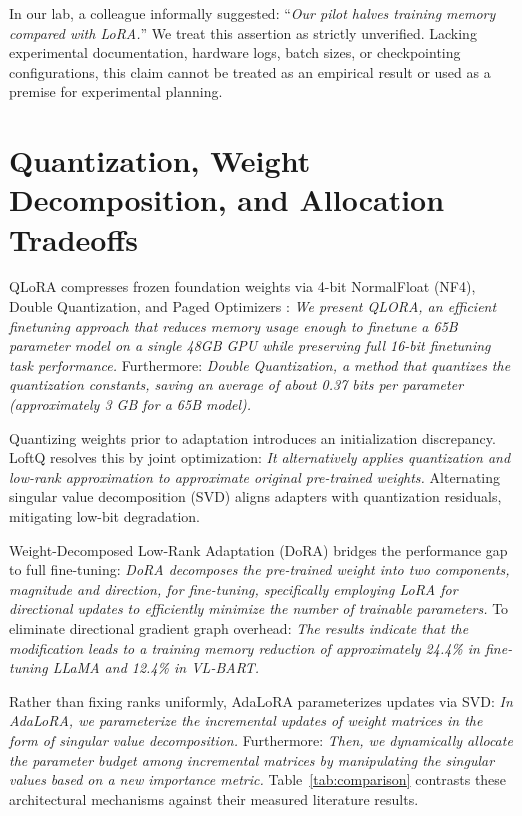 \documentclass[11pt,a4paper]{article}
\begin{document}
In our lab, a colleague informally suggested: ``\textit{Our pilot halves training memory compared with LoRA.}'' We treat this assertion as strictly unverified. Lacking experimental documentation, hardware logs, batch sizes, or checkpointing configurations, this claim cannot be treated as an empirical result or used as a premise for experimental planning.

\section{Quantization, Weight Decomposition, and Allocation Tradeoffs}

QLoRA compresses frozen foundation weights via 4-bit NormalFloat (NF4), Double Quantization, and Paged Optimizers \cite{dettmers2023qlora}: \textit{We present QLORA, an efficient finetuning approach that reduces memory usage enough to finetune a 65B parameter model on a single 48GB GPU while preserving full 16-bit finetuning task performance.} \cite{dettmers2023qlora} Furthermore: \textit{Double Quantization, a method that quantizes the quantization constants, saving an average of about 0.37 bits per parameter (approximately 3 GB for a 65B model).} \cite{dettmers2023qlora}

Quantizing weights prior to adaptation introduces an initialization discrepancy. LoftQ resolves this by joint optimization: \textit{It alternatively applies quantization and low-rank approximation to approximate original pre-trained weights.} \cite{li2023loftq} Alternating singular value decomposition (SVD) aligns adapters with quantization residuals, mitigating low-bit degradation.

Weight-Decomposed Low-Rank Adaptation (DoRA) bridges the performance gap to full fine-tuning: \textit{DoRA decomposes the pre-trained weight into two components, magnitude and direction, for fine-tuning, specifically employing LoRA for directional updates to efficiently minimize the number of trainable parameters.} \cite{liu2024dora} To eliminate directional gradient graph overhead: \textit{The results indicate that the modification leads to a training memory reduction of approximately 24.4\% in fine-tuning LLaMA and 12.4\% in VL-BART.} \cite{liu2024dora}

Rather than fixing ranks uniformly, AdaLoRA parameterizes updates via SVD: \textit{In AdaLoRA, we parameterize the incremental updates of weight matrices in the form of singular value decomposition.} \cite{zhang2023adalora} Furthermore: \textit{Then, we dynamically allocate the parameter budget among incremental matrices by manipulating the singular values based on a new importance metric.} \cite{zhang2023adalora} Table~\ref{tab:comparison} contrasts these architectural mechanisms against their measured literature results.
\end{document}
